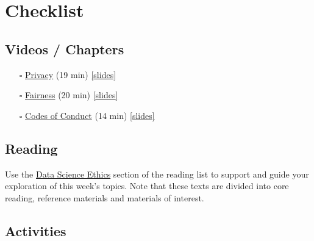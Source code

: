 \documentclass[
  letterpaper,
  DIV=11,
  numbers=noendperiod]{scrreprt}
\begin{document}
\chapter*{Checklist}\label{ethics-checklist}


\section*{Videos / Chapters}\label{videos-chapters-4}


\begin{itemize}
\item[$\square$]
  \href{https://imperial.cloud.panopto.eu/Panopto/Pages/Viewer.aspx?id=5d85c64e-ce0a-4a18-bd3b-afa5010ceca8}{Privacy}
  (19 min)
  \href{https://github.com/zakvarty/effective-data-science-slides-2022/raw/main/05-01-privacy/05-01-privacy.pdf}{{[}slides{]}}
\item[$\square$]
  \href{https://imperial.cloud.panopto.eu/Panopto/Pages/Viewer.aspx?id=96301a9c-c129-44fd-bd3f-afa700fdeeaa}{Fairness}
  (20 min)
  \href{https://github.com/zakvarty/effective-data-science-slides-2022/raw/main/05-02-fairness/05-02-fairness.pdf}{{[}slides{]}}
\item[$\square$]
  \href{https://imperial.cloud.panopto.eu/Panopto/Pages/Viewer.aspx?id=5c457e71-1f44-4272-a46b-afa701747ba6}{Codes
  of Conduct} (14 min)
  \href{https://github.com/zakvarty/effective-data-science-slides-2022/raw/main/05-03-codes-of-conduct/05-03-codes-of-conduct.pdf}{{[}slides{]}}
\end{itemize}

\section*{Reading}\label{reading-4}


Use the \hyperref[ethics-reading]{Data Science Ethics} section of the
reading list to support and guide your exploration of this week's
topics. Note that these texts are divided into core reading, reference
materials and materials of interest.

\section*{Activities}\label{activities-2}
\end{document}

